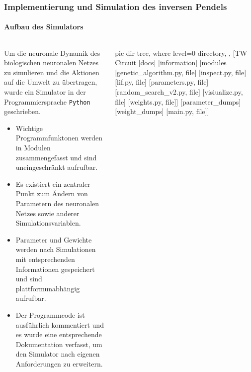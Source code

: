 \documentclass[10pt,t,aspectratio=1610]{beamer}
\newcommand{\ChapterCartpole}{Implementierung und Simulation des inversen Pendels}
\begin{document}
\begin{frame}
\frametitle{\ChapterCartpole}
\framesubtitle{Aufbau des Simulators}
\vspace{0.3cm}
\begin{columns}[T,onlytextwidth]
	\begin{column}{0.7\textwidth}
		Um die neuronale Dynamik des biologischen neuronalen Netzes zu simulieren und die Aktionen auf die Umwelt zu übertragen, wurde ein Simulator in der Programmiersprache \texttt{Python} geschrieben.
		\vspace{0.1cm}
		\begin{itemize}
			\item Wichtige Programmfunktonen werden in Modulen zusammengefasst und sind uneingeschränkt aufrufbar.
			\item Es existiert ein zentraler Punkt zum Ändern von Parametern des neuronalen Netzes sowie anderer Simulationsvariablen.
			\item Parameter und Gewichte werden nach Simulationen mit entsprechenden Informationen gespeichert und sind plattformunabhängig aufrufbar.
			\item Der Programmcode ist ausführlich kommentiert und es wurde eine entsprechende Dokumentation verfasst, um den Simulator nach eigenen Anforderungen zu erweitern.
		\end{itemize}
	\end{column}
	\hspace{-0.8cm}
	\begin{column}{0.28\textwidth}
		\vspace{-0.7cm}
		\resizebox{4cm}{!} {
		\begin{forest}
			pic dir tree,
			where level=0{}{%
				directory,
			},
			[TW Circuit
			[docs]
			[information]
			[modules
			[genetic\_algorithm.py, file]
			[inspect.py, file]
			[lif.py, file]
			[parameters.py, file]
			[random\_search\_v2.py, file]
			[visiualize.py, file]
			[weights.py, file]]
			[parameter\_dumps]
			[weight\_dumps]
			[main.py, file]]
		\end{forest}
		}
	\end{column}
\end{columns}
\end{frame}

\end{document}
